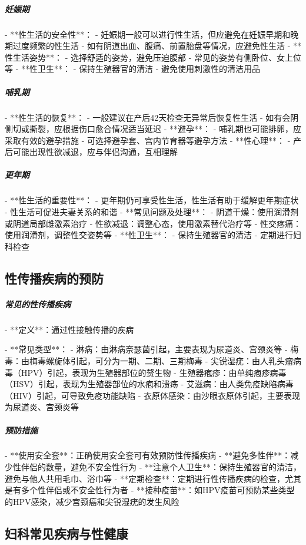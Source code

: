 \begin{enumerate}
\subparagraph{妊娠期}

- **性生活的安全性**：
  - 妊娠期一般可以进行性生活，但应避免在妊娠早期和晚期过度频繁的性生活
  - 如有阴道出血、腹痛、前置胎盘等情况，应避免性生活
- **性生活姿势**：
  - 选择舒适的姿势，避免压迫腹部
  - 常见的姿势有侧卧位、女上位等
- **性卫生**：
  - 保持生殖器官的清洁
  - 避免使用刺激性的清洁用品

\subparagraph{哺乳期}

- **性生活的恢复**：
  - 一般建议在产后42天检查无异常后恢复性生活
  - 如有会阴侧切或撕裂，应根据伤口愈合情况适当延迟
- **避孕**：
  - 哺乳期也可能排卵，应采取有效的避孕措施
  - 可选择避孕套、宫内节育器等避孕方法
- **性心理**：
  - 产后可能出现性欲减退，应与伴侣沟通，互相理解

\subparagraph{更年期}

- **性生活的重要性**：
  - 更年期仍可享受性生活，性生活有助于缓解更年期症状
  - 性生活可促进夫妻关系的和谐
- **常见问题及处理**：
  - 阴道干燥：使用润滑剂或阴道局部雌激素治疗
  - 性欲减退：调整心态，使用激素替代治疗等
  - 性交疼痛：使用润滑剂，调整性交姿势等
- **性卫生**：
  - 保持生殖器官的清洁
  - 定期进行妇科检查

\subsection{性传播疾病的预防}

\subparagraph{常见的性传播疾病}

- **定义**：通过性接触传播的疾病

- **常见类型**：
  - 淋病：由淋病奈瑟菌引起，主要表现为尿道炎、宫颈炎等
  - 梅毒：由梅毒螺旋体引起，可分为一期、二期、三期梅毒
  - 尖锐湿疣：由人乳头瘤病毒（HPV）引起，表现为生殖器部位的赘生物
  - 生殖器疱疹：由单纯疱疹病毒（HSV）引起，表现为生殖器部位的水疱和溃疡
  - 艾滋病：由人类免疫缺陷病毒（HIV）引起，可导致免疫功能缺陷
  - 衣原体感染：由沙眼衣原体引起，主要表现为尿道炎、宫颈炎等

\subparagraph{预防措施}

- **使用安全套**：正确使用安全套可有效预防性传播疾病
- **避免多性伴**：减少性伴侣的数量，避免不安全性行为
- **注意个人卫生**：保持生殖器官的清洁，避免与他人共用毛巾、浴巾等
- **定期检查**：定期进行性传播疾病的检查，尤其是有多个性伴侣或不安全性行为者
- **接种疫苗**：如HPV疫苗可预防某些类型的HPV感染，减少宫颈癌和尖锐湿疣的发生风险

\subsection{妇科常见疾病与性健康}


\end{enumerate}
